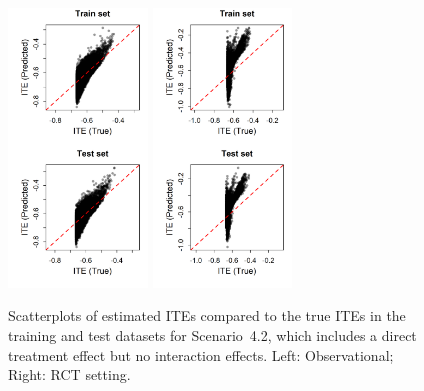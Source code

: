\begin{figure}[htbp]
\centering
\includegraphics[width=0.33\textwidth]{img/results/observ_scenario2_ITE_scatter_train_test.png}
\includegraphics[width=0.33\textwidth]{img/results/rct_scenario2_ITE_scatter_train_test.png}
\vspace{-17pt}
\caption{Scatterplots of estimated ITEs compared to the true ITEs in the training and test datasets for Scenario~4.2, which includes a direct treatment effect but no interaction effects. Left: Observational; Right: RCT setting.}
\label{fig:scenario2_ite_scatter_train_test}
\end{figure}




